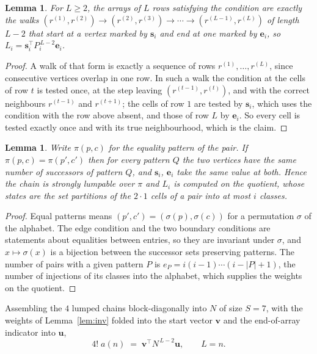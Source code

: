 \documentclass[11pt,a4paper]{article}
\theoremstyle{plain}
\newtheorem{lemma}[theorem]{Lemma}
\theoremstyle{definition}
\begin{document}
\begin{lemma}\label{lem:walk}
For $L\ge2$, the arrays of $L$ rows satisfying the condition are exactly the walks
$(r^{(1)},r^{(2)})\to(r^{(2)},r^{(3)})\to\cdots\to(r^{(L-1)},r^{(L)})$ of length
$L-2$ that start at a vertex marked by $\mathbf{s}_i$ and end at one marked by
$\mathbf{e}_i$, so
$L_i=\mathbf{s}_i^{\!\top}P_i^{\,L-2}\mathbf{e}_i$.
\end{lemma}

\begin{proof}
A walk of that form is exactly a sequence of rows $r^{(1)},\dots,r^{(L)}$, since
consecutive vertices overlap in one row. In such a walk the condition at the cells of
row $t$ is tested once, at the step leaving $(r^{(t-1)},r^{(t)})$, and with the
correct neighbours $r^{(t-1)}$ and $r^{(t+1)}$; the cells of row $1$ are tested by
$\mathbf{s}_i$, which uses the condition with the row above absent, and those of row
$L$ by $\mathbf{e}_i$. So every cell is tested exactly once and with its true
neighbourhood, which is the claim.
\end{proof}

\begin{lemma}\label{lem:lump}
Write $\pi(p,c)$ for the equality pattern of the pair. If $\pi(p,c)=\pi(p',c')$ then for
every pattern $Q$ the two vertices have the same number of successors of pattern $Q$, and
$\mathbf{s}_i$, $\mathbf{e}_i$ take the same value at both. Hence the chain is strongly
lumpable over $\pi$ and $L_i$ is computed on the quotient, whose states are the set
partitions of the $2\cdot1$ cells of a pair into at most $i$ classes.
\end{lemma}

\begin{proof}
Equal patterns means $(p',c')=(\sigma(p),\sigma(c))$ for a permutation $\sigma$ of the
alphabet. The edge condition and the two boundary conditions are statements about equalities
between entries, so they are invariant under $\sigma$, and $x\mapsto\sigma(x)$ is a bijection
between the successor sets preserving patterns. The number of pairs with a given pattern $P$
is $e_P=i(i-1)\cdots(i-|P|+1)$, the number of injections of its classes into the alphabet,
which supplies the weights on the quotient.
\end{proof}

Assembling the $4$ lumped chains block-diagonally into $N$ of size $S=7$, with the
weights of Lemma~\ref{lem:inv} folded into the start vector $\mathbf{v}$ and the
end-of-array indicator into $\mathbf{u}$,
\begin{equation}\label{eq:walk2}
4!\;a(n)\;=\;\mathbf{v}^{\!\top}N^{\,L-2}\mathbf{u},\qquad L=n .
\end{equation}
\end{document}
